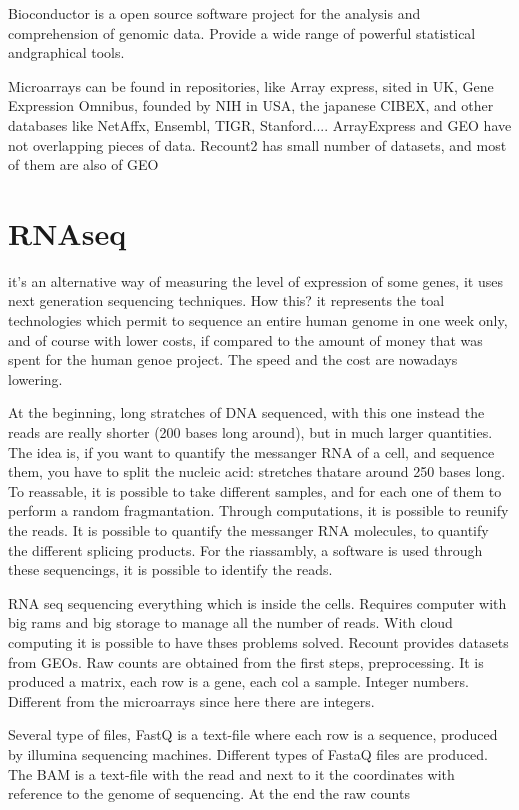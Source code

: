 Bioconductor is a open source software project for the analysis and comprehension of genomic data. Provide  a wide range of powerful statistical andgraphical tools.



Microarrays can be found in repositories, like Array express, sited in UK, Gene Expression Omnibus, founded by NIH in USA, the japanese CIBEX, and other databases like NetAffx, Ensembl, TIGR, Stanford.... ArrayExpress and GEO have not overlapping pieces of data. Recount2 has small number of datasets, and most of them are also of GEO


\section{RNAseq}
it's an alternative way of measuring the level of expression of some genes, it uses next generation sequencing techniques. How this? it represents the toal technologies which permit to sequence an entire human genome in one week only, and of course with lower costs, if compared to the amount of money that was spent for the human genoe project. The speed and the cost are nowadays lowering.


At the beginning, long stratches of DNA sequenced, with this one instead the reads are really shorter (200 bases long around), but in much larger quantities. The idea is, if you want to quantify the messanger RNA of a cell, and sequence them, you have to split the nucleic acid: stretches thatare around 250 bases long.
To reassable, it is possible to take different samples, and for each one of them to perform a random fragmantation. Through computations, it is possible to reunify the reads. It is possible to quantify the messanger RNA molecules, to quantify the different splicing products. For the riassambly, a software is used 
 through these sequencings, it is possible to identify the reads.

RNA seq sequencing everything which is inside the cells. Requires computer with big rams and big storage to manage all the number of reads. With cloud computing it is possible to have thses problems solved. Recount provides datasets from GEOs. Raw counts are obtained from the first steps, preprocessing. It is produced a matrix, each row is a gene, each col a sample. Integer numbers. Different from the microarrays since here there are integers.

Several type of files,
FastQ is a text-file where each row is a sequence, produced by illumina sequencing machines. Different types of FastaQ files are produced. The BAM is a text-file with the read and next to it the coordinates with reference to the genome of sequencing. At the end the raw counts

